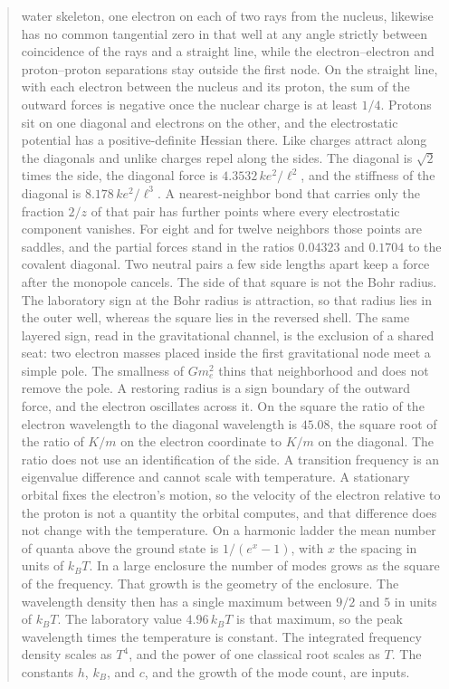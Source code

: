 \documentclass[a4paper]{article}
\begin{document}
\begin{abstract}
water skeleton, one electron on each of two rays from the nucleus, likewise has no common tangential zero in that well at any angle strictly between coincidence of the rays and a straight line, while the electron--electron and proton--proton separations stay outside the first node. On the straight line, with each electron between the nucleus and its proton, the sum of the outward forces is negative once the nuclear charge is at least \(1/4\). Protons sit on one diagonal and electrons on the other, and the electrostatic potential has a positive-definite Hessian there. Like charges attract along the diagonals and unlike charges repel along the sides. The diagonal is \(\sqrt{2}\) times the side, the diagonal force is \(4.3532\,k e^{2}/\ell^{2}\), and the stiffness of the diagonal is \(8.178\,k e^{2}/\ell^{3}\). A nearest-neighbor bond that carries only the fraction \(2/z\) of that pair has further points where every electrostatic component vanishes. For eight and for twelve neighbors those points are saddles, and the partial forces stand in the ratios \(0.04323\) and \(0.1704\) to the covalent diagonal. Two neutral pairs a few side lengths apart keep a force after the monopole cancels. The side of that square is not the Bohr radius. The laboratory sign at the Bohr radius is attraction, so that radius lies in the outer well, whereas the square lies in the reversed shell. The same layered sign, read in the gravitational channel, is the exclusion of a shared seat: two electron masses placed inside the first gravitational node meet a simple pole. The smallness of \(G m_e^{2}\) thins that neighborhood and does not remove the pole. A restoring radius is a sign boundary of the outward force, and the electron oscillates across it. On the square the ratio of the electron wavelength to the diagonal wavelength is \(45.08\), the square root of the ratio of \(K/m\) on the electron coordinate to \(K/m\) on the diagonal. The ratio does not use an identification of the side. A transition frequency is an eigenvalue difference and cannot scale with temperature. A stationary orbital fixes the electron's motion, so the velocity of the electron relative to the proton is not a quantity the orbital computes, and that difference does not change with the temperature. On a harmonic ladder the mean number of quanta above the ground state is \(1/(e^{x}-1)\), with \(x\) the spacing in units of \(k_B T\). In a large enclosure the number of modes grows as the square of the frequency. That growth is the geometry of the enclosure. The wavelength density then has a single maximum between \(9/2\) and \(5\) in units of \(k_B T\). The laboratory value \(4.96\,k_B T\) is that maximum, so the peak wavelength times the temperature is constant. The integrated frequency density scales as \(T^{4}\), and the power of one classical root scales as \(T\). The constants \(h\), \(k_B\), and \(c\), and the growth of the mode count, are inputs.
\end{abstract}
\end{document}
